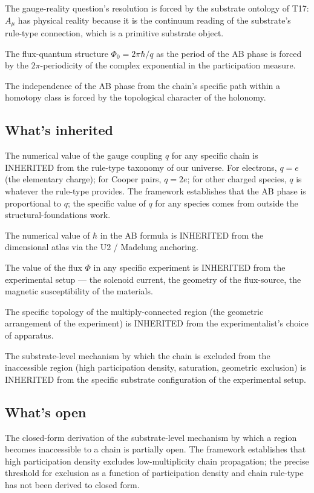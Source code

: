 \documentclass[11pt,a4paper]{article}
\begin{document}
The gauge-reality question's resolution is forced by the substrate ontology of T17: $A_\mu$ has physical reality because it is the continuum reading of the substrate's rule-type connection, which is a primitive substrate object.

The flux-quantum structure $\Phi_0 = 2\pi\hbar/q$ as the period of the AB phase is forced by the $2\pi$-periodicity of the complex exponential in the participation measure.

The independence of the AB phase from the chain's specific path within a homotopy class is forced by the topological character of the holonomy.

\subsection{What's inherited}

The numerical value of the gauge coupling $q$ for any specific chain is INHERITED from the rule-type taxonomy of our universe. For electrons, $q = e$ (the elementary charge); for Cooper pairs, $q = 2e$; for other charged species, $q$ is whatever the rule-type provides. The framework establishes that the AB phase is proportional to $q$; the specific value of $q$ for any species comes from outside the structural-foundations work.

The numerical value of $\hbar$ in the AB formula is INHERITED from the dimensional atlas via the U2 / Madelung anchoring.

The value of the flux $\Phi$ in any specific experiment is INHERITED from the experimental setup --- the solenoid current, the geometry of the flux-source, the magnetic susceptibility of the materials.

The specific topology of the multiply-connected region (the geometric arrangement of the experiment) is INHERITED from the experimentalist's choice of apparatus.

The substrate-level mechanism by which the chain is excluded from the inaccessible region (high participation density, saturation, geometric exclusion) is INHERITED from the specific substrate configuration of the experimental setup.

\subsection{What's open}

The closed-form derivation of the substrate-level mechanism by which a region becomes inaccessible to a chain is partially open. The framework establishes that high participation density excludes low-multiplicity chain propagation; the precise threshold for exclusion as a function of participation density and chain rule-type has not been derived to closed form.
\end{document}
